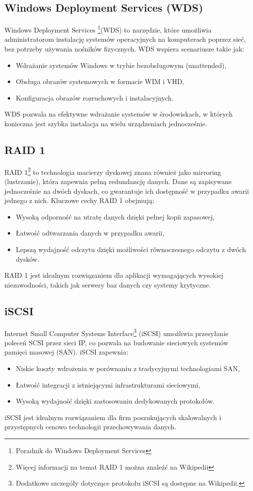 \subsection{Windows Deployment Services (WDS)}
Windows Deployment Services \footnote{Poradnik do Windows Deployment Services\cite{wds}}(WDS) to narzędzie, które umożliwia administratorom instalację systemów operacyjnych na komputerach poprzez sieć, bez potrzeby używania nośników fizycznych. WDS wspiera scenariusze takie jak:
\begin{itemize}
	\item Wdrażanie systemów Windows w trybie bezobsługowym (unattended),
\item Obsługa obrazów systemowych w formacie WIM i VHD,
\item Konfiguracja obrazów rozruchowych i instalacyjnych.
\end{itemize}
WDS pozwala na efektywne wdrażanie systemów w środowiskach, w których konieczna jest szybka instalacja na wielu urządzeniach jednocześnie.

\subsection{RAID 1}
RAID 1\footnote{Więcej informacji na temat RAID 1 można znaleźć na Wikipedii\cite{raid}} to technologia macierzy dyskowej znana również jako mirroring (lustrzanie), która zapewnia pełną redundancję danych. Dane są zapisywane jednocześnie na dwóch dyskach, co gwarantuje ich dostępność w przypadku awarii jednego z nich. Kluczowe cechy RAID 1 obejmują:
\begin{itemize}
	\item Wysoką odporność na utratę danych dzięki pełnej kopii zapasowej,
\item Łatwość odtwarzania danych w przypadku awarii,
\item Lepszą wydajność odczytu dzięki możliwości równoczesnego odczytu z dwóch dysków.
\end{itemize}
RAID 1 jest idealnym rozwiązaniem dla aplikacji wymagających wysokiej niezawodności, takich jak serwery baz danych czy systemy krytyczne.

\subsection{iSCSI}
Internet Small Computer Systems Interface\footnote{Dodatkowe szczegóły dotyczące protokołu iSCSI są dostępne na Wikipedii.\cite{iscsi}} (iSCSI) umożliwia przesyłanie poleceń SCSI przez sieci IP, co pozwala na budowanie sieciowych systemów pamięci masowej (SAN). iSCSI zapewnia:
\begin{itemize}
	\item Niskie koszty wdrożenia w porównaniu z tradycyjnymi technologiami SAN,
\item Łatwość integracji z istniejącymi infrastrukturami sieciowymi,
\item Wysoką wydajność dzięki zastosowaniu dedykowanych protokołów.
\end{itemize}
iSCSI jest idealnym rozwiązaniem dla firm poszukujących skalowalnych i przystępnych cenowo technologii przechowywania danych.

